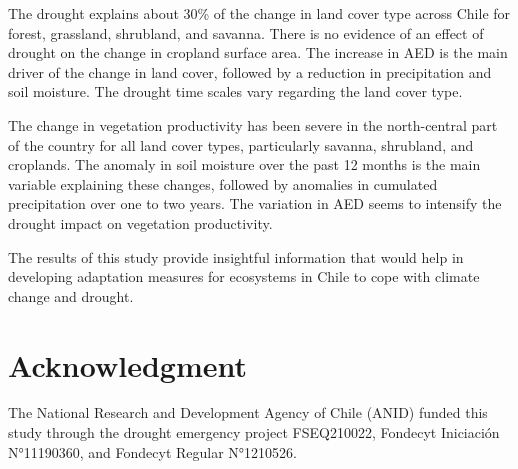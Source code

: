\documentclass[
  authoryear,
  preprint,
  3p,
  onecolumn]{elsarticle}
\begin{document}
The drought explains about 30\% of the change in land cover type across
Chile for forest, grassland, shrubland, and savanna. There is no
evidence of an effect of drought on the change in cropland surface area.
The increase in AED is the main driver of the change in land cover,
followed by a reduction in precipitation and soil moisture. The drought
time scales vary regarding the land cover type.

The change in vegetation productivity has been severe in the
north-central part of the country for all land cover types, particularly
savanna, shrubland, and croplands. The anomaly in soil moisture over the
past 12 months is the main variable explaining these changes, followed
by anomalies in cumulated precipitation over one to two years. The
variation in AED seems to intensify the drought impact on vegetation
productivity.

The results of this study provide insightful information that would help
in developing adaptation measures for ecosystems in Chile to cope with
climate change and drought.

\hypertarget{acknowledgment}{%
\section{Acknowledgment}\label{acknowledgment}}

The National Research and Development Agency of Chile (ANID) funded this
study through the drought emergency project FSEQ210022, Fondecyt
Iniciación N°11190360, and Fondecyt Regular N°1210526.


\renewcommand\refname{References}
  
\end{document}
